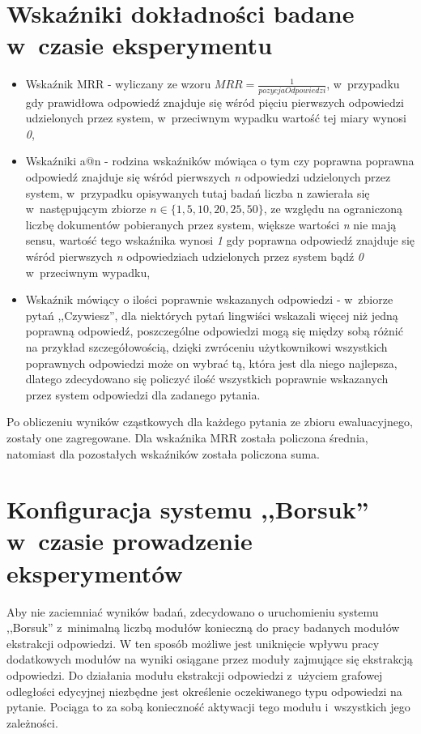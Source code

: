 \documentclass[a4paper, twoside, openright, 12pt]{report}
\begin{document}
    \section{Wskaźniki dokładności badane w~czasie eksperymentu}
        \begin{itemize}
            \item Wskaźnik MRR - wyliczany ze wzoru $ MRR = \frac{1}{pozycjaOdpowiedzi} $, w~przypadku gdy prawidłowa
                odpowiedź znajduje się wśród pięciu pierwszych odpowiedzi udzielonych przez system, w~przeciwnym wypadku
                wartość tej miary wynosi \emph{0},
            \item Wskaźniki a@n - rodzina wskaźników mówiąca o tym czy poprawna poprawna odpowiedź znajduje się wśród
                pierwszych \emph{n} odpowiedzi udzielonych przez system, w~przypadku opisywanych tutaj badań liczba
                n zawierała się w~następującym zbiorze $ n \in \{1, 5, 10, 20, 25, 50\} $, ze względu na ograniczoną
                liczbę dokumentów pobieranych przez system, większe wartości \emph{n} nie mają sensu, wartość tego
                wskaźnika wynosi \emph{1} gdy poprawna odpowiedź znajduje się wśród pierwszych \emph{n} odpowiedziach
                udzielonych przez system bądź \emph{0} w~przeciwnym wypadku,
           \item Wskaźnik mówiący o ilości poprawnie wskazanych odpowiedzi - w~zbiorze pytań ,,Czywiesz'', dla niektórych
               pytań lingwiści wskazali więcej niż jedną poprawną odpowiedź, poszczególne odpowiedzi mogą się między
               sobą różnić na przykład szczegółowością, dzięki zwróceniu użytkownikowi wszystkich poprawnych odpowiedzi
               może on wybrać tą, która jest dla niego najlepsza, dlatego zdecydowano się policzyć ilość wszystkich
               poprawnie wskazanych przez system odpowiedzi dla zadanego pytania.
        \end{itemize}

        Po obliczeniu wyników cząstkowych dla każdego pytania ze zbioru ewaluacyjnego, zostały one zagregowane. Dla wskaźnika
        MRR została policzona średnia, natomiast dla pozostałych wskaźników została policzona suma.

     \section{Konfiguracja systemu ,,Borsuk'' w~czasie prowadzenie eksperymentów}
        Aby nie zaciemniać wyników badań, zdecydowano o uruchomieniu systemu ,,Borsuk'' z~minimalną liczbą modułów
        konieczną do pracy badanych modułów ekstrakcji odpowiedzi. W ten sposób możliwe jest uniknięcie wpływu pracy
        dodatkowych modułów na wyniki osiągane przez moduły zajmujące się ekstrakcją odpowiedzi. Do działania modułu
        ekstrakcji odpowiedzi z~użyciem grafowej odległości edycyjnej niezbędne jest określenie oczekiwanego typu
        odpowiedzi na pytanie. Pociąga to za sobą konieczność aktywacji tego modułu i~wszystkich jego zależności.
\end{document}

